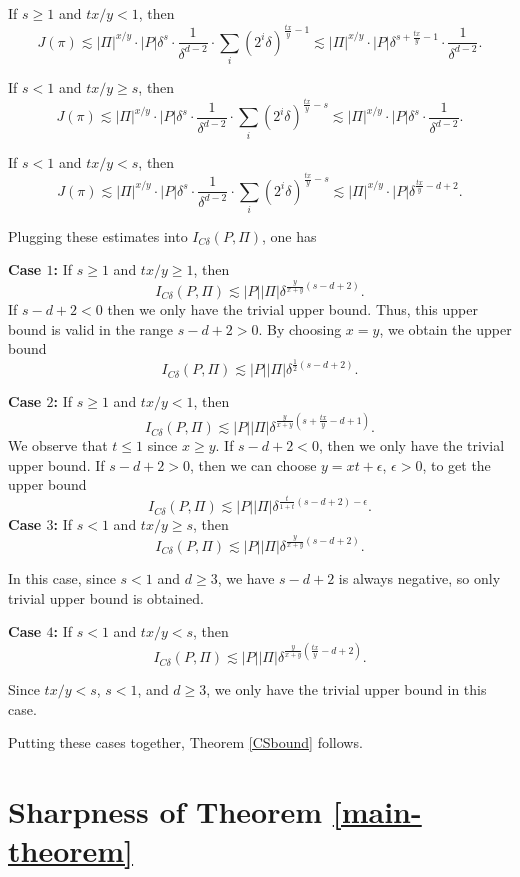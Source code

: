 \documentclass[11pt]{article}
\newcommand{\1}{\mathbf{1}}
\begin{document}
If $s\ge 1$ and $tx/y < 1$, then
\[J(\pi)\lesssim |\Pi|^{x/y} \cdot |P|\delta^{s} \cdot \frac{1}{\delta^{d-2}}\cdot \sum_{i}(2^i\delta)^{\frac{tx}{y}-1}\lesssim |\Pi|^{x/y} \cdot |P|\delta^{s+\frac{tx}{y}-1} \cdot \frac{1}{\delta^{d-2}}.\]


If $s< 1$ and $tx/y\ge s$, then
\[J(\pi)\lesssim |\Pi|^{x/y} \cdot |P|\delta^{s} \cdot \frac{1}{\delta^{d-2}}\cdot \sum_{i}(2^i\delta)^{\frac{tx}{y}-s}\lesssim |\Pi|^{x/y} \cdot |P|\delta^{s} \cdot \frac{1}{\delta^{d-2}}.\]


If $s< 1$ and $tx/y < s$, then
\[J(\pi)\lesssim |\Pi|^{x/y} \cdot |P|\delta^{s} \cdot \frac{1}{\delta^{d-2}}\cdot \sum_{i}(2^i\delta)^{\frac{tx}{y}-s}\lesssim |\Pi|^{x/y} \cdot |P|\delta^{\frac{tx}{y}-d+2}.\]



Plugging these estimates into $I_{C\delta}(P, \Pi)$, one has 

{\bf Case $1$:} If $s\ge 1$ and $tx/y\ge 1$, then
\[I_{C\delta}(P, \Pi)\lesssim |P||\Pi|\delta^{\frac{y}{x+y}\left(s-d+2\right)}.\]
If $s-d+2<0$ then we only have the trivial upper bound. Thus, this upper bound is valid in the range $s-d+2>0$. By choosing $x=y$, we obtain the upper bound
\[I_{C\delta}(P, \Pi) \lesssim |P||\Pi|\delta^{\frac{1}{2}\left(s-d+2\right)}. \]

{\bf Case $2$:} If $s\ge 1$ and $tx/y<1$, then
\[I_{C\delta}(P, \Pi)\lesssim |P||\Pi|\delta^{\frac{y}{x+y}\left(s+\frac{tx}{y}-d+1\right)}.\]
We observe that $t\le 1$ since $x\ge y$. If $s-d+2<0$, then we only have the trivial upper bound. If $s-d+2>0$, then we can choose 
$y=xt+\epsilon$, $\epsilon > 0$, to get the upper bound \[I_{C\delta}(P, \Pi)\lesssim |P||\Pi|\delta^{\frac{t}{1+t}\left(s-d+2\right) - \epsilon}.\]
{\bf Case $3$:} If $s< 1$ and $tx/y\ge s$, then
\[I_{C\delta}(P, \Pi)\lesssim |P||\Pi|\delta^{\frac{y}{x+y}\left(s-d+2\right)}.\]

In this case, since $s < 1$ and $d \geq 3$, we have $s-d+2$ is always negative, so only trivial upper bound is obtained. 



{\bf Case $4$:} If $s< 1$ and $tx/y< s$, then
\[I_{C\delta}(P, \Pi)\lesssim |P||\Pi|\delta^{\frac{y}{x+y}\left(\frac{tx}{y}-d+2\right)}.\]

Since $tx/y<s$, $s<1$, and $d\ge 3$, we only have the trivial upper bound in this case. 


Putting these cases together, Theorem \ref{CSbound} follows.
\section{Sharpness of Theorem \ref{main-theorem}}
\end{document}
